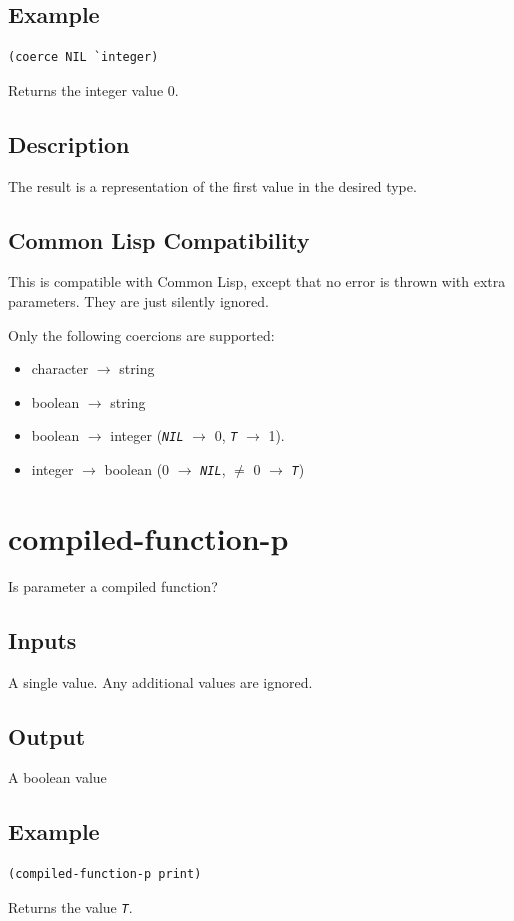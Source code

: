 \documentclass[10pt, openany]{book}
\newcommand{\constant}[1]{\emph{\texttt{#1}}}
\newcommand{\cl}{Common Lisp}
\begin{document}
\subsection{Example}
\begin{lstlisting}
(coerce NIL `integer)
\end{lstlisting}
Returns the integer value 0.
\subsection{Description}
The result is a representation of the first value in the desired type.
\subsection{Common Lisp Compatibility}
This is compatible with \cl, except that no error is thrown with extra parameters.  They are just silently ignored.

Only the following coercions are supported:
\begin{itemize}
  \item character $\rightarrow$ string
  \item boolean $\rightarrow$ string
  \item boolean $\rightarrow$ integer (\constant{NIL} $\rightarrow$ 0, \constant{T} $\rightarrow$ 1).
  \item integer $\rightarrow$ boolean (0 $\rightarrow$ \constant{NIL}, $\neq$ 0 $\rightarrow$ \constant{T})
\end{itemize}

\section{compiled-function-p}
Is parameter a compiled function?
\subsection{Inputs}
A single value.  Any additional values are ignored.
\subsection{Output}
A boolean value
\subsection{Example}
\begin{lstlisting}
(compiled-function-p print)
\end{lstlisting}
Returns the value \constant{T}.
\end{document}
